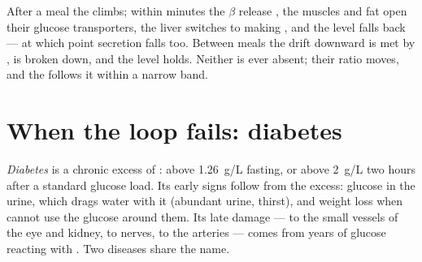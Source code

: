 \begin{example}\label{ex:g12:glucose-and-diabetes:loop}
After a meal the  climbs; within minutes the $\beta$ 
release , the muscles and fat  open their glucose
transporters, the liver switches to making , and the level
falls back --- at which point  secretion falls too. Between
meals the drift downward is met by ,  is broken down,
and the level holds. Neither  is ever absent; their ratio
moves, and the  follows it within a narrow band.
\end{example}

\section{When the loop fails: diabetes}

\begin{definition}[Diabetes]\label{def:g12:glucose-and-diabetes:diabetes}
\emph{Diabetes} is a chronic excess of :
above \qty{1.26}{g/L} fasting, or above \qty{2}{g/L} two hours after a
standard glucose load. Its early signs follow from the excess: glucose
in the urine, which drags water with it (abundant urine, thirst), and
weight loss when  cannot use the glucose around them. Its late
damage --- to the small vessels of the eye and kidney, to nerves, to
the arteries --- comes from years of glucose reacting with .
Two diseases share the name.
\end{definition}

